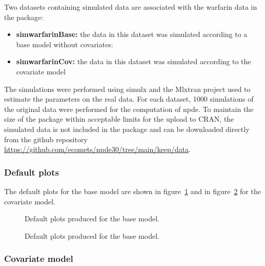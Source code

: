 Two datasets containing simulated data are associated with the {\sf warfarin} data in the package:
\begin{itemize}
\item {\bf simwarfarinBase:} the data in this dataset was simulated according to a base model without covariates:
\item {\bf simwarfarinCov:} the data in this dataset was simulated according to the covariate model
\end{itemize}
The simulations were performed using {\sf simulx} and the Mlxtran project used to estimate the parameters on the real data. For each dataset, 1000 simulations of the original data were performed for the computation of npde. To maintain the size of the package within acceptable limits for the upload to CRAN, the simulated data is not included in the package and can be downloaded directly from the github repository \url{https://github.com/ecomets/npde30/tree/main/keep/data}.

\subsubsection{Default plots}

\hskip 18pt The default plots for the base model are shown in figure~\ref{fig:warfDefault} and in figure~\ref{fig:warfCovDefault} for the covariate model.

\begin{figure}[!h]
\par\kern -0.2cm
\begin{center}
\end{center}
\caption{Default plots produced for the base model.}\label{fig:warfDefault}
\end{figure}

\begin{figure}[!h]
\par\kern -0.2cm
\begin{center}
\end{center}
\caption{Default plots produced for the base model.}\label{fig:warfCovDefault}
\end{figure}

\subsubsection{Covariate model}

